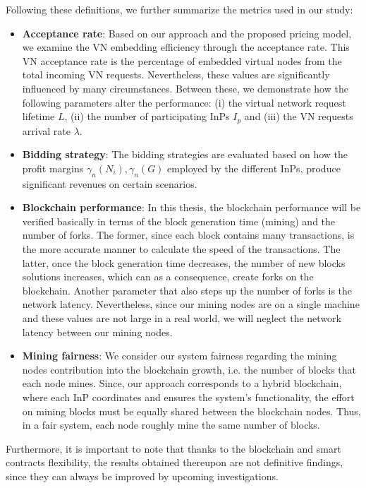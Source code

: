 Following these definitions, we further summarize the metrics used in our study:

 \begin{itemize}
\item \textbf{Acceptance rate}: Based on our approach and the proposed pricing model, we examine the VN embedding efficiency through the acceptance rate. This VN acceptance rate is the percentage of embedded virtual nodes from the total incoming VN requests. Nevertheless, these values are significantly influenced by many circumstances. Between these, we demonstrate how the following parameters alter the performance: (i) the virtual network request lifetime $L$, (ii) the number of participating InPs $I_p$ and (iii) the VN requests arrival rate $\lambda$.

\item \textbf{Bidding strategy}: The bidding strategies are evaluated based on how the profit margins $\gamma_n(N_i),\gamma_n(G)$ employed by the different InPs, produce significant revenues on certain scenarios. 

\item \textbf{Blockchain performance}: In this thesis, the blockchain performance will be verified basically in terms of the block generation time (mining) and the number of forks. The former, since each block contains many transactions, is the more accurate manner to calculate the speed of the transactions. The latter, once the block generation time decreases, the number of new blocks solutions increases, which can as a consequence, create forks on the blockchain. Another parameter that also steps up the number of forks is the network latency. Nevertheless, since our mining nodes are on a single machine and these values are not large in a real world, we will neglect the network latency between our mining nodes.
\item \textbf{Mining fairness}: We consider our system fairness regarding the mining nodes contribution into the blockchain growth, i.e. the number of blocks that each node mines. Since, our approach corresponds to a hybrid blockchain, where each InP coordinates and ensures the system's functionality, the effort on mining blocks must be equally shared between the blockchain nodes. Thus, in a fair system, each node roughly mine the same number of blocks.
 \end{itemize}

Furthermore, it is important to note that thanks to the blockchain and smart contracts flexibility, the results obtained thereupon are not definitive findings, since they can always be improved by upcoming investigations.

